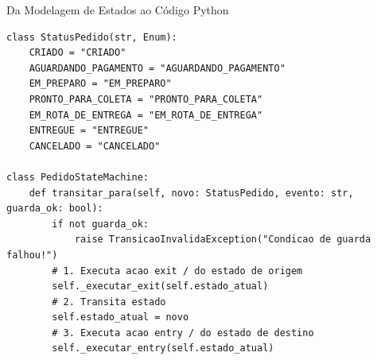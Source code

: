 \documentclass[10pt]{beamer}
\begin{document}
\begin{frame}[fragile]{Da Modelagem de Estados ao Código Python}
\begin{lstlisting}
class StatusPedido(str, Enum):
    CRIADO = "CRIADO"
    AGUARDANDO_PAGAMENTO = "AGUARDANDO_PAGAMENTO"
    EM_PREPARO = "EM_PREPARO"
    PRONTO_PARA_COLETA = "PRONTO_PARA_COLETA"
    EM_ROTA_DE_ENTREGA = "EM_ROTA_DE_ENTREGA"
    ENTREGUE = "ENTREGUE"
    CANCELADO = "CANCELADO"

class PedidoStateMachine:
    def transitar_para(self, novo: StatusPedido, evento: str, guarda_ok: bool):
        if not guarda_ok:
            raise TransicaoInvalidaException("Condicao de guarda falhou!")
        # 1. Executa acao exit / do estado de origem
        self._executar_exit(self.estado_atual)
        # 2. Transita estado
        self.estado_atual = novo
        # 3. Executa acao entry / do estado de destino
        self._executar_entry(self.estado_atual)
\end{lstlisting}
\end{frame}
\end{document}
